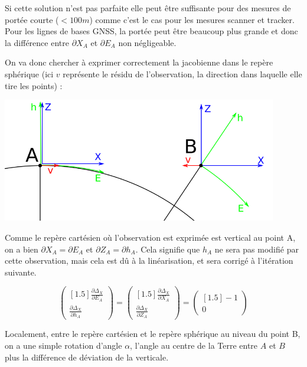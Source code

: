 \documentclass[french]{report}
\begin{document}
Si cette solution n'est pas parfaite elle peut être suffisante pour des mesures de portée courte ($<100m$) comme c'est le cas pour les mesures scanner et tracker. Pour les lignes de bases GNSS, la portée peut être beaucoup plus grande et donc la différence entre $\partial X_A$ et $\partial E_A$ non négligeable.

On va donc chercher à exprimer correctement la jacobienne dans le repère sphérique (ici $v$ représente le résidu de l'observation, la direction dans laquelle elle tire les points) :
\begin{center}
\includegraphics[width = 12cm]{images/cart_spher_obs_res}
\end{center}

Comme le repère cartésien où l'observation est exprimée est vertical au point A, on a bien $\partial X_A = \partial E_A$ et $\partial Z_A = \partial h_A$. Cela signifie que $h_A$ ne sera pas modifié par cette observation, mais cela est dû à la linéarisation, et sera corrigé à l'itération suivante.

$$
\begin{pmatrix}[1.5] \frac{\partial \Delta_X}{\partial E_A}\\ \frac{\partial \Delta_X}{\partial h_A}\end{pmatrix}
=
\begin{pmatrix}[1.5] \frac{\partial \Delta_X}{\partial X_A}\\ \frac{\partial \Delta_X}{\partial Z_A} \end{pmatrix}
=
\begin{pmatrix}[1.5] -1\\ 0 \end{pmatrix}
$$


Localement, entre le repère cartésien et le repère sphérique au niveau du point B, on a une simple rotation d'angle $\alpha$, l'angle au centre de la Terre entre $A$ et $B$ plus la différence de déviation de la verticale.
\end{document}
